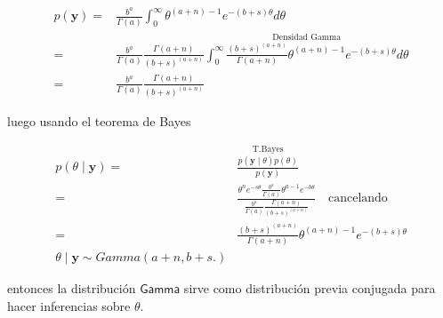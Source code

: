 \documentclass[
]{article}
\begin{document}
\begin{align}
p(\boldsymbol{y})=& \frac{b^a}{\Gamma (a)}\int_0 ^\infty \theta^{(a+n)-1}e^{-(b+s)\theta}d\theta \\
                =& \frac{b^a}{\Gamma (a)}\frac{\Gamma (a+n) }{(b+s)^{(a+n)}} \stackrel{\text{Densidad Gamma}}{ \int_0 ^\infty \frac{(b+s)^{(a+n)}} {\Gamma (a+n) }\theta^{(a+n)-1}e^{-(b+s)\theta}d\theta }  \\
                =& \frac{b^a}{\Gamma (a)}\frac{\Gamma (a+n) }{(b+s)^{(a+n)}} 
\end{align}

luego usando el teorema de Bayes

\begin{align}
  p(\theta \mid \boldsymbol{y}) = & \stackrel{\text{T.Bayes}}{\frac{p(\boldsymbol{y}\mid \theta)p(\theta)}{p(\boldsymbol{y})}} \\
                              = &\frac{\theta^n e^{-s\theta}\frac{b^a}{\Gamma (a)}\theta^{a-1}e^{-b\theta}}{\frac{b^a}{\Gamma (a)}\frac{\Gamma (a+n) }{(b+s)^{(a+n)}} } \quad \text{cancelando}\\
                              =&\frac{(b+s)^{(a+n)}}{\Gamma (a+n) }\theta^{(a+n)-1} e^{-(b+s) \theta}\\
                              \theta \mid \boldsymbol{y} \sim Gamma(a+n,b+s.)
\end{align}

entonces la distribución \(\textsf{Gamma}\) sirve como distribución
previa conjugada para hacer inferencias sobre \(\theta\).
\end{document}
